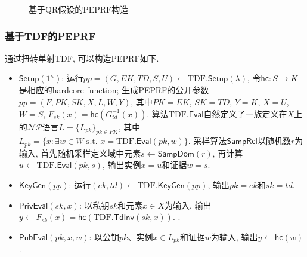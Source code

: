 \begin{figure}[!hbtp]
\begin{center}
\end{center}
\caption{基于QR假设的PEPRF构造}\label{figure:QR-based-PEPRF}
\end{figure}


\subsubsection{基于TDF的PEPRF}
通过扭转单射TDF, 可以构造PEPRF如下. 
\begin{construction}[基于TDF的PEPRF构造]\label{construction:TDF-based-PEPRF}
\begin{itemize}
    \item $\mathsf{Setup}(1^\kappa)$: 运行$pp = (G, EK, TD, S, U) \leftarrow \text{TDF}.\mathsf{Setup}(\lambda)$, 
        令$\mathsf{hc}: S \rightarrow K$是相应的hardcore function; 
        生成PEPRF的公开参数$pp = (F, PK, SK, X, L, W, Y)$, 其中$PK = EK$, $SK = TD$, $Y = K$, $X = U$, $W = S$, 
        $F_{sk}(x) = \mathsf{hc}(G_{td}^{-1}(x))$. 
        算法$\text{TDF}.\mathsf{Eval}$自然定义了一族定义在$X$上的$\mathcal{NP}$语言$L = \{L_{pk}\}_{pk \in PK}$, 
        其中$L_{pk} = \{x: \exists w \in W \text{~s.t.~} x = \text{TDF}.\mathsf{Eval}(pk, w)\}$.  
        采样算法$\mathsf{SampRel}$以随机数$r$为输入, 首先随机采样定义域中元素$s \leftarrow \mathsf{SampDom}(r)$, 
        再计算$u \leftarrow \text{TDF}.\mathsf{Eval}(pk, s)$, 输出实例$x = u$和证据$w = s$.   

    \item $\mathsf{KeyGen}(pp)$: 运行$(ek, td) \leftarrow \text{TDF}.\mathsf{KeyGen}(pp)$, 输出$pk = ek$和$sk = td$.  

    \item $\mathsf{PrivEval}(sk, x)$: 以私钥$sk$和元素$x \in X$为输入, 
        输出$y \leftarrow F_{sk}(x) = \mathsf{hc}(\text{TDF}.\mathsf{TdInv}(sk, x))$. .  

    \item $\mathsf{PubEval}(pk, x, w)$: 以公钥$pk$、实例$x \in L_{pk}$和证据$w$为输入, 输出$y \leftarrow \mathsf{hc}(w)$. 
\end{itemize} 
\end{construction}

